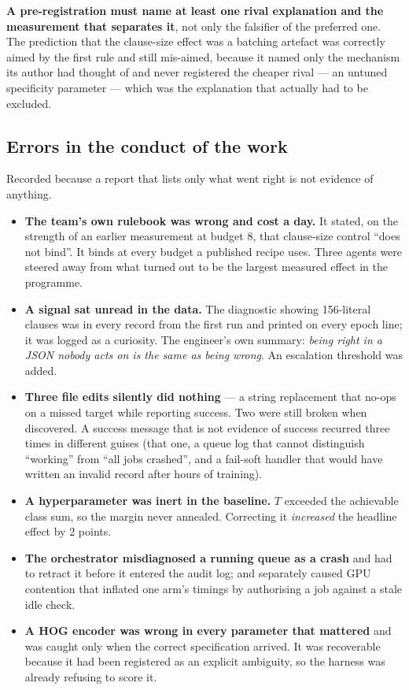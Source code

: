 \textbf{A pre-registration must name at least one rival explanation and the measurement that
separates it}, not only the falsifier of the preferred one. The prediction that the clause-size effect
was a batching artefact was correctly aimed by the first rule and still mis-aimed, because it named
only the mechanism its author had thought of and never registered the cheaper rival --- an untuned
specificity parameter --- which was the explanation that actually had to be excluded.

\subsection{Errors in the conduct of the work}
Recorded because a report that lists only what went right is not evidence of anything.

\begin{itemize}
\item \textbf{The team's own rulebook was wrong and cost a day.} It stated, on the strength of an
      earlier measurement at budget 8, that clause-size control ``does not bind''. It binds at every
      budget a published recipe uses. Three agents were steered away from what turned out to be the
      largest measured effect in the programme.
\item \textbf{A signal sat unread in the data.} The diagnostic showing 156-literal clauses was in
      every record from the first run and printed on every epoch line; it was logged as a curiosity.
      The engineer's own summary: \emph{being right in a JSON nobody acts on is the same as being
      wrong}. An escalation threshold was added.
\item \textbf{Three file edits silently did nothing} --- a string replacement that no-ops on a missed
      target while reporting success. Two were still broken when discovered. A success message that is
      not evidence of success recurred three times in different guises (that one, a queue log that
      cannot distinguish ``working'' from ``all jobs crashed'', and a fail-soft handler that would
      have written an invalid record after hours of training).
\item \textbf{A hyperparameter was inert in the baseline.} $T$ exceeded the achievable class sum, so
      the margin never annealed. Correcting it \emph{increased} the headline effect by 2 points.
\item \textbf{The orchestrator misdiagnosed a running queue as a crash} and had to retract it before
      it entered the audit log; and separately caused GPU contention that inflated one arm's timings
      by authorising a job against a stale idle check.
\item \textbf{A HOG encoder was wrong in every parameter that mattered} and was caught only when the
      correct specification arrived. It was recoverable because it had been registered as an explicit
      ambiguity, so the harness was already refusing to score it.
\end{itemize}
